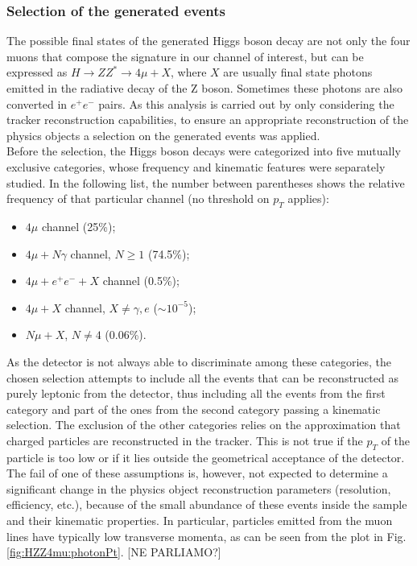\documentclass[a4paper,twoside,12pt]{article}
\begin{document}
\subsubsection{Selection of the generated events}
The possible final states of the generated Higgs boson decay are not only the four muons that 
compose the signature in our channel of interest, but can be expressed as $H \rightarrow
ZZ^* \rightarrow 4\mu + X$, where $X$ are usually final state photons emitted in the
radiative decay of the Z boson. Sometimes these photons are also converted in $e^{+}e^{-}$ pairs.
 As this analysis is carried out by only considering the tracker reconstruction capabilities, to ensure 
an appropriate reconstruction of the physics objects a selection on the 
generated events was applied.\\

Before the selection, the Higgs boson decays were categorized into five 
mutually exclusive categories, whose frequency and kinematic features were separately 
studied. In the following list, the number between parentheses shows the relative frequency
of that particular channel (no threshold on $p_{T}$ applies):

\begin{itemize}
\item $4\mu$ channel (25\%);
\item $4\mu + N\gamma$ channel, $N \geq 1$ (74.5\%);
\item $4\mu + e^+e^- + X$ channel (0.5\%);
\item $4\mu + X$ channel, $X \neq \gamma, e$ ($\sim 10^{-5}$);
\item $N\mu + X$, $N \neq 4$ (0.06\%).
\end{itemize}

As the detector is not always able to discriminate among these categories, the chosen selection attempts to include all the events that can be reconstructed as purely leptonic from
the detector, thus including all the events
from the first category and part of the ones from the second category passing a kinematic 
selection. The exclusion of the other categories relies on the approximation that charged
particles are reconstructed in the tracker. This is not true if the $p_{T}$ of the particle is 
too low or if it lies outside the geometrical acceptance of the detector. The fail of one 
of these assumptions is, however, not expected to determine a significant change in the
physics object reconstruction parameters (resolution, efficiency, etc.), because of the
small abundance of these events inside the sample and their kinematic properties. 
In particular, particles emitted from the muon lines have typically low transverse momenta, as can be 
seen from the plot in Fig.\ref{fig:HZZ4mu:photonPt}. [NE PARLIAMO?]\\
\end{document}
